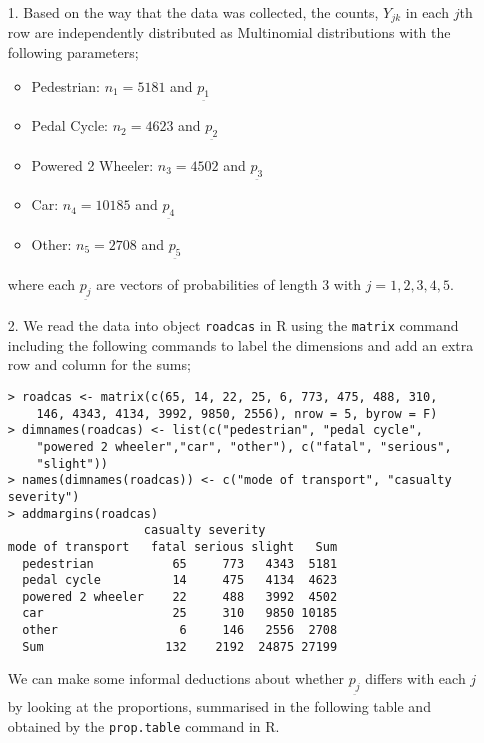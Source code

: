\documentclass[11pt,a4]{article}
\begin{document}
\begin{enumerate}

	
\item[1.]
Based on the way that the data was collected, the counts, $Y_{jk}$ in each $j$th row are independently distributed as Multinomial distributions with the following parameters;

\begin{itemize}
    \item Pedestrian: $n_{1} = 5181$ and $\underset{\bar{}}{p_{1}}$
    \item Pedal Cycle: $n_{2} = 4623$ and $\underset{\bar{}}{p_{2}}$
    \item Powered 2 Wheeler: $n_{3} = 4502$ and $\underset{\bar{}}{p_{3}}$
    \item Car: $n_{4} = 10185$ and $\underset{\bar{}}{p_{4}}$
    \item Other: $n_{5} = 2708$ and $\underset{\bar{}}{p_{5}}$
\end{itemize}

where each $\underset{\bar{}}{p_{j}}$ are vectors of probabilities of length $3$ with $j = 1,2,3,4,5$.

\bigskip

\item[2.] 
We read the data into object \verb|roadcas| in R using the \verb|matrix| command including the following commands to label the dimensions and add an extra row and column for the sums;

\begin{verbatim}
> roadcas <- matrix(c(65, 14, 22, 25, 6, 773, 475, 488, 310, 
    146, 4343, 4134, 3992, 9850, 2556), nrow = 5, byrow = F)
> dimnames(roadcas) <- list(c("pedestrian", "pedal cycle", 
    "powered 2 wheeler","car", "other"), c("fatal", "serious", 
    "slight"))
> names(dimnames(roadcas)) <- c("mode of transport", "casualty 
severity")
> addmargins(roadcas)
                   casualty severity
mode of transport   fatal serious slight   Sum
  pedestrian           65     773   4343  5181
  pedal cycle          14     475   4134  4623
  powered 2 wheeler    22     488   3992  4502
  car                  25     310   9850 10185
  other                 6     146   2556  2708
  Sum                 132    2192  24875 27199
\end{verbatim}
 
We can make some informal deductions about whether $\underset{\bar{}}{p_{j}}$ differs with each $j$ by looking at the proportions, summarised in the following table and obtained by the \verb|prop.table| command in R.


\end{enumerate}
\end{document}

